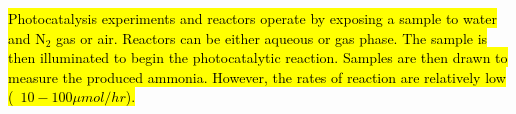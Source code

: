 
\hl{Photocatalysis experiments and reactors operate by exposing a sample to water and N$_2$ gas or air. Reactors can be either aqueous or gas phase. The sample is then illuminated to begin the photocatalytic reaction. Samples are then drawn to measure the produced ammonia. However, the rates of reaction are  relatively low (~$10-100 \mu mol/hr$).}

